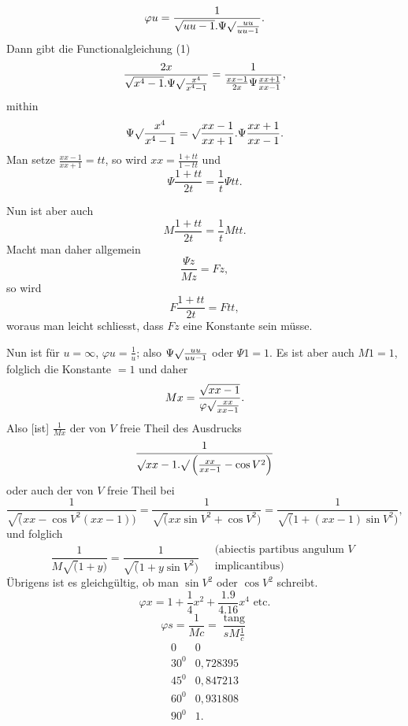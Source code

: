 \[\varphi u=\frac1{\sqrt{uu-1}.\Psi\surd\frac{uu}{uu-1}}.\]
\noindent Dann gibt die Functionalgleichung (1)
\[\frac{2x}{\sqrt{x^4-1}.\Psi\surd\frac{x^4}{x^4-1}}
=\frac1{\frac{xx-1}{2x}\Psi\frac{xx+1}{xx-1}},\]
\noindent mithin
\[\Psi\surd\frac{x^4}{x^4-1}=\surd\frac{xx-1}{xx+1}.\Psi\frac{xx+1}{xx-1}.\]
\noindent Man setze \(\frac{xx-1}{xx+1}=tt\), so wird \(xx=\frac{1+tt}{1-tt}\) und
\[\Psi\frac{1+tt}{2t}=\frac1t\Psi tt.\]
\par\indent Nun ist aber auch
\[M\frac{1+tt}{2t}=\frac1t Mtt.\]
\clearpage
{}
\noindent Macht man daher allgemein
\[\frac{\Psi z}{Mz}=Fz,\]
\noindent so wird
\[F\frac{1+tt}{2t}=Ftt,\]
\noindent woraus man leicht schliesst, dass \(Fz\) eine Konstante sein müsse.
\par\indent Nun ist für \(u=\infty\), \(\varphi u=\frac1u\); also \(\Psi\surd\frac{uu}{uu-1}\) oder \(\Psi1=1\).
Es ist aber auch \(M1=1\), folglich die Konstante \(=1\) und daher
\[Mx=\frac{\sqrt{xx-1}}{\varphi\surd\frac{xx}{xx-1}}.\]
\noindent Also [ist] \(\frac1{Mx}\) der von \(V\) freie Theil des Ausdrucks
\[\frac1{\surd xx-1.\surd\left(\frac{xx}{xx-1}-\cos V^2\right)}\]
\noindent oder auch der von \(V\) freie Theil bei
{\small\[\frac1{\surd(xx-\cos V^2(xx-1))}
=\frac1{\surd(xx\sin V^2+\cos V^2)}
=\frac1{\surd(1+(xx-1)\sin V^2)},\]}
\noindent und folglich
\[\frac1{M\surd(1+y)}=\frac1{\surd(1+y\sin V^2)}
\quad\begin{gathered}\text{(abiectis partibus angulum }V\\\text{implicantibus)}\end{gathered}\]
\noindent Übrigens ist es gleichgültig, ob man \(\sin V^2\) oder \(\cos V^2\) schreibt.
\[\varphi x=1+\frac14x^2+\frac{1.9}{4.16}x^4\text{ etc.}\]
\[\varphi s=\frac1{Mc}=\frac{\operatorname{tang}}{sM\frac1c}\]
\[\begin{array}{rr}
0&0\\
30^0&0{,}728395\\
45^0&0{,}847213\\
60^0&0{,}931808\\
90^0&1.
\end{array}\]
\ClosingRule
\clearpage
\endgroup

